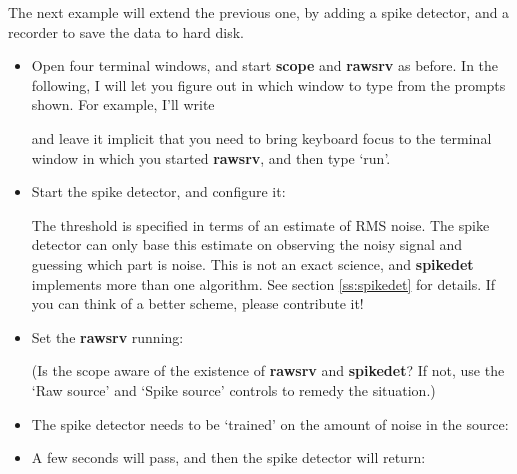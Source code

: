\documentclass[12pt,oneside]{book}
\def\prog#1{{\bf #1}}
\begin{document}
The next example will extend the previous one, by adding a spike
detector, and a recorder to save the data to hard disk.
\begin{itemize}
\item Open four terminal windows, and start \prog{scope} and
\prog{rawsrv} as before. In the following, I will let you figure out
in which window to type from the prompts shown. For example, I'll
write
\begin{quotation}
\end{quotation}
and leave it implicit that you need to bring keyboard focus to the
terminal window in which you started \prog{rawsrv}, and then type `run'.
\item Start the spike detector, and configure it:
\begin{quotation}
\uprompt{}
\end{quotation}
The threshold is specified in terms of an estimate of RMS noise. 
The spike detector can only base this estimate on observing the noisy signal
and guessing which part is noise. This is not an exact science, and
\prog{spikedet} implements more than one algorithm. See section
\ref{ss:spikedet} for details. If you can think of a better scheme,
please contribute it!
\item Set the \prog{rawsrv} running:
\begin{quotation}
\end{quotation}
(Is the scope aware of the existence of \prog{rawsrv} and
\prog{spikedet}? If not, use the `Raw source' and `Spike source'
controls to remedy the situation.)
\item The spike detector needs to be `trained' on the amount of noise
in the source:
\begin{quotation}
\end{quotation}
\item A few seconds will pass, and then the spike detector will
return:
\begin{quotation}

\end{quotation}
\end{itemize}
\end{document}
